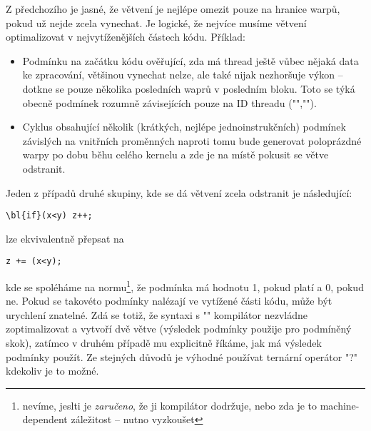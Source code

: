         Z předchozího je jasné, že větvení je nejlépe omezit pouze na hranice warpů, pokud už nejde zcela vynechat. Je logické, že nejvíce musíme větvení optimalizovat v nejvytíženějších částech kódu. Příklad:
        \begin{itemize}
        \item Podmínku na začátku kódu ověřující, zda má thread ještě vůbec nějaká data ke zpracování, většinou vynechat nelze, ale také nijak nezhoršuje výkon -- dotkne se pouze několika posledních waprů v posledním bloku. Toto se týká obecně podmínek rozumně závisejících pouze na ID threadu (\Vr"",\Vr"").
        \item Cyklus obsahující několik (krátkých, nejlépe jednoinstrukčních) podmínek závislých na vnitřních proměnných naproti tomu bude generovat poloprázdné warpy po dobu běhu celého kernelu a zde je na místě pokusit se větve odstranit.
        \end{itemize}
        Jeden z případů druhé skupiny, kde se dá větvení zcela odstranit je následující: 
        \begin{Verbatim}[commandchars = \\\{\}]
\bl{if}(x<y) z++;
        \end{Verbatim}
        lze ekvivalentně přepsat na 
        \begin{Verbatim}[commandchars = \\\{\}]
z += (x<y);
        \end{Verbatim}
        kde se spoléháme na normu\footnote{nevíme, jeslti je \emph{zaručeno}, že ji kompilátor dodržuje, nebo zda je to machine-dependent záležitost -- nutno vyzkoušet}, že podmínka má hodnotu 1, pokud platí a 0, pokud ne. Pokud se takovéto podmínky nalézají ve vytížené části kódu, může být urychlení znatelné. Zdá se totiž, že syntaxi s \Vr"" kompilátor nezvládne zoptimalizovat a vytvoří dvě větve (výsledek podmínky použije pro podmíněný skok), zatímco v druhém případě mu explicitně říkáme, jak má výsledek podmínky použít. Ze stejných důvodů je výhodné používat ternární operátor \Vr"?" kdekoliv je to možné.
        
